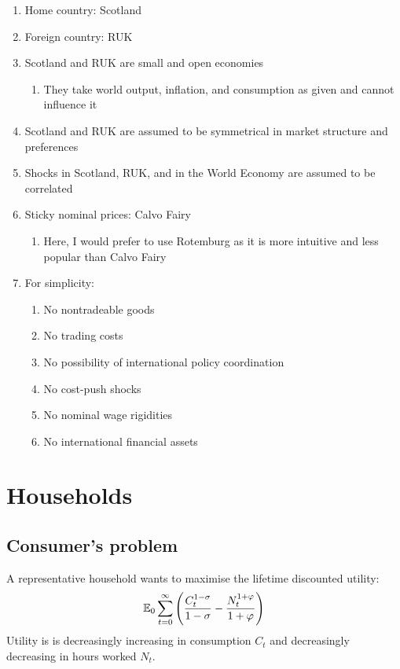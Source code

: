 \documentclass[12pt]{article}
\begin{document}
\begin{enumerate}


    \item Home country: Scotland
    \item  Foreign country: RUK
    \item  Scotland and RUK are small and open economies
          \begin{enumerate}
              \item They take world output, inflation, and consumption as given and cannot influence it
          \end{enumerate}
    \item Scotland and RUK are assumed to be symmetrical in market structure and preferences
    \item Shocks in Scotland, RUK, and in the World Economy are assumed to be correlated
    \item Sticky nominal prices: Calvo Fairy
          \begin{enumerate}
              \item Here, I would prefer to use Rotemburg as it is more intuitive and less popular than Calvo Fairy
          \end{enumerate}
    \item For simplicity:
          \begin{enumerate}
              \item No nontradeable goods
              \item No trading costs
              \item No possibility of international policy coordination
              \item No cost-push shocks
              \item No nominal wage rigidities
              \item No international financial assets
          \end{enumerate}

\end{enumerate}

\pagebreak

\section{Households}
\subsection*{Consumer's problem}
A representative household wants to maximise the lifetime discounted utility:
\begin{equation}
    \operatorname{\mathbb{E}}_0 \sum^{\infty}_{t=0} \left( \frac{C_t^{1-\sigma}}{1-\sigma} - \frac{N_t^{1+\varphi}}{1+\varphi} \right)
\end{equation}
Utility is is decreasingly increasing in consumption $C_t$ and decreasingly decreasing in hours worked $N_t$.
\end{document}
